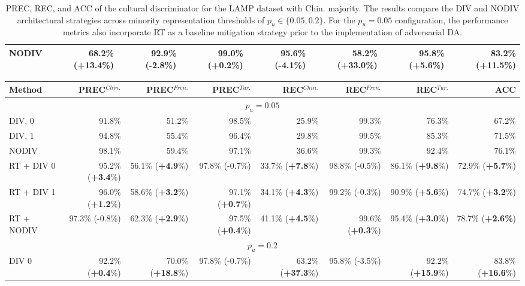 \begin{table}
\begin{tabular}{lrrrrrrr}
NODIV           & 68.2\% (\textbf{+13.4}\%) & 92.9\% (-2.8\%) & 99.0\% (\textbf{+0.2}\%) & 95.6\% (-4.1\%) & 58.2\% (\textbf{+33.0}\%) & 95.8\% (\textbf{+5.6}\%) & 83.2\% (\textbf{+11.5}\%) \\
\bottomrule
\end{tabular}
\caption{PREC, REC, and ACC of the cultural discriminator for the LAMP dataset with Chin. majority. The results compare the DIV and NODIV architectural strategies across minority representation thresholds of $p_u \in \{0.05, 0.2\}$. For the $p_u = 0.05$ configuration, the performance metrics also incorporate RT as a baseline mitigation strategy prior to the implementation of adversarial DA.}
\label{ch3:tab:discr:LC}
\end{table}
%
%
\begin{table}
\centering
\scriptsize
\setlength{\tabcolsep}{0.1cm}
\begin{tabular}{lrrrrrrr}
\toprule
\textbf{Method} & \textbf{PREC}$^{Chin.}$  & \textbf{PREC}$^{Fren.}$ & \textbf{PREC}$^{Tur.}$ & \textbf{REC}$^{Chin.}$ & \textbf{REC}$^{Fren.}$ & \textbf{REC}$^{Tur.}$ &  \textbf{ACC}\\
\midrule
\multicolumn{8}{c}{$p_u=0.05$} \\
\midrule
DIV, 0 & 91.8\%&	51.2\%&	98.5\%&	25.9\%&	99.3\%	&	76.3\%&	67.2\%	\\
DIV, 1 & 94.8\%	&	55.4\%&	96.4\%&	29.8\%&	99.5\%&	85.3\%&	71.5\%\\
NODIV & 98.1\%&	59.4\%&	97.1\%&	36.6\%&	99.3\%&	92.4\%	&	76.1\%\\
\midrule
RT + DIV 0      & 95.2\% (\textbf{+3.4}\%) & 56.1\% (\textbf{+4.9}\%) & 97.8\% (-0.7\%) & 33.7\% (\textbf{+7.8}\%) & 98.8\% (-0.5\%) & 86.1\% (\textbf{+9.8}\%) & 72.9\% (\textbf{+5.7}\%) \\
RT + DIV 1      & 96.0\% (\textbf{+1.2}\%) & 58.6\% (\textbf{+3.2}\%) & 97.1\% (\textbf{+0.7}\%) & 34.1\% (\textbf{+4.3}\%) & 99.2\% (-0.3\%) & 90.9\% (\textbf{+5.6}\%) & 74.7\% (\textbf{+3.2}\%) \\
RT + NODIV      & 97.3\% (-0.8\%) & 62.3\% (\textbf{+2.9}\%) & 97.5\% (\textbf{+0.4}\%) & 41.1\% (\textbf{+4.5}\%) & 99.6\% (\textbf{+0.3}\%) & 95.4\% (\textbf{+3.0}\%) & 78.7\% (\textbf{+2.6\%}) \\
\midrule
\multicolumn{8}{c}{$p_u=0.2$} \\
\midrule
DIV 0           & 92.2\% (\textbf{+0.4}\%) & 70.0\% (\textbf{+18.8}\%) & 97.8\% (-0.7\%) & 63.2\% (\textbf{+37.3}\%) & 95.8\% (-3.5\%) & 92.2\% (\textbf{+15.9}\%) & 83.8\% (\textbf{+16.6}\%) \\

\end{tabular}
\end{table}
